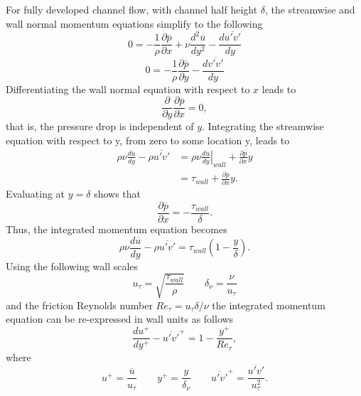 \documentclass[oneside,a4paper,11pt]{report}
\newcommand{\pavg}{\overline{p}}
\newcommand{\uavg}{\overline{u}}
\newcommand{\ufluc}{u'}
\newcommand{\vfluc}{v'}
\begin{document}
For fully developed channel flow, with channel half height $\delta$, the streamwise and wall normal momentum equations simplify to the following
\begin{equation}
0 = -\frac{1}{\rho}\frac{\partial \pavg}{\partial x} + \nu \frac{d^2 \uavg}{d y^2} - \frac{ d \overline{\ufluc \vfluc} }{d y}
\end{equation}
\begin{equation}
0 = -\frac{1}{\rho}\frac{\partial \pavg}{\partial y} - \frac{d \overline{\vfluc \vfluc} }{d y}
\end{equation}
Differentiating the wall normal equation with respect to $x$ leads to
\begin{equation}
\frac{\partial}{\partial y} \frac{\partial \pavg}{\partial x} = 0,
\end{equation}
that is, the pressure drop is independent of $y$. Integrating the streamwise equation with respect to y, from zero to some location y, leads to
\begin{align}
\rho \nu \frac{d \uavg}{d y} - \rho \overline{\ufluc \vfluc} &= \left . \rho \nu \frac{d \uavg}{d y} \right |_{wall} + \frac{\partial \pavg}{\partial x} y \nonumber \\
& = \tau_{wall} + \frac{\partial \pavg}{\partial x} y.
\end{align}
Evaluating at $y = \delta$ shows that
\begin{equation}
\frac{\partial \pavg}{\partial x} = -\frac{\tau_{wall}}{\delta}.
\end{equation}
Thus, the integrated momentum equation becomes
\begin{equation}
\rho \nu \frac{d \uavg}{d y} - \rho \overline{\ufluc \vfluc} = \tau_{wall} \left ( 1 - \frac{y}{\delta} \right ).
\end{equation}
Using the following wall scales
\begin{equation}
u_\tau = \sqrt{\frac{\tau_{wall}}{\rho}} \qquad \delta_\nu = \frac{\nu}{u_\tau} 
\end{equation}
and the friction Reynolds number $Re_\tau = u_\tau \delta/\nu$ the integrated momentum equation can be re-expressed in wall units as follows
\begin{equation}
\frac{du^+}{dy^+} - \overline{\ufluc \vfluc}^+ = 1 - \frac{y^+}{Re_\tau},
\end{equation}
where 
\begin{equation}
    u^+ = \frac{\uavg}{u_\tau} \qquad y^+ = \frac{y}{\delta_{\nu}} \qquad \overline{\ufluc \vfluc}^+ = \frac{\overline{\ufluc \vfluc}}{u_\tau^2}.
\end{equation}
\end{document}
